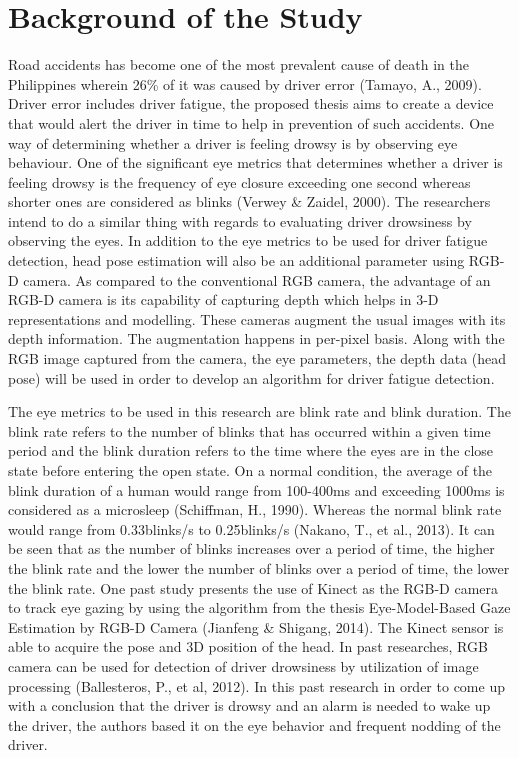 \section{Background of the Study}


Road accidents has become one of the most prevalent cause of death in the Philippines wherein 26\% of it was caused by driver error (Tamayo, A., 2009). Driver error includes driver fatigue, the proposed thesis aims to create a device that would alert the driver in time to help in prevention of such accidents. One way of determining whether a driver is feeling drowsy is by observing eye behaviour. One of the significant eye metrics that determines whether a driver is feeling drowsy is the frequency of eye closure exceeding one second whereas shorter ones are considered as blinks (Verwey \& Zaidel, 2000). The researchers intend to do a similar thing with regards to evaluating driver drowsiness by observing the eyes. In addition to the eye metrics to be used for driver fatigue detection, head pose estimation will also be an additional parameter using RGB-D camera. As compared to the conventional RGB camera, the advantage of an RGB-D camera is its capability of capturing depth which helps in 3-D representations and modelling. These cameras augment the usual images with its depth information. The augmentation happens in per-pixel basis. Along with the RGB image captured from the camera, the eye parameters, the depth data (head pose)  will be used in order to develop an algorithm for driver fatigue detection.

The eye metrics to be used in this research are blink rate and blink duration. The blink rate refers to the number of blinks that has occurred within a given time period and the blink duration refers to the time where the eyes are in the close state before entering the open state. On a normal condition, the average of the blink duration of a human would range from 100-400ms and exceeding 1000ms is considered as a microsleep (Schiffman, H., 1990). Whereas the normal blink rate would range from 0.33blinks/s to 0.25blinks/s (Nakano, T., et al., 2013). It can be seen that as the number of blinks increases over a period of time, the higher the blink rate and the lower the number of blinks over a period of time, the lower the blink rate.
One past study presents the use of Kinect as the RGB-D camera to track eye gazing by using the algorithm from the thesis Eye-Model-Based Gaze Estimation by RGB-D Camera (Jianfeng \& Shigang, 2014). The Kinect sensor is able to acquire the pose and 3D position of the head. In past researches, RGB camera can be used for detection of driver drowsiness by utilization of image processing (Ballesteros, P., et al, 2012). In this past research in order to come up with a conclusion that the driver is drowsy and an alarm is needed to wake up the driver, the authors based it on the eye behavior and frequent nodding of the driver.



